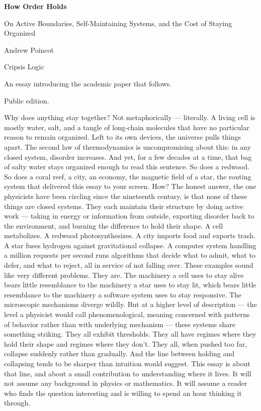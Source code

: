 \documentclass[12pt]{article}
\begin{document}
\begin{titlepage}
\centering
\vspace*{1.5in}
{\Huge\bfseries How Order Holds\par}
\vspace{0.4in}
{\Large On Active Boundaries, Self-Maintaining Systems, and the Cost of Staying Organized\par}
\vspace{0.8in}
{\large Andrew Poincot\par}
{\large Cripsis Logic\par}
\vfill
{An essay introducing the academic paper that follows.\par}
{Public edition.\par}
\end{titlepage}


Why does anything stay together? Not metaphorically --- literally. A living cell is mostly water, salt, and a tangle of long-chain molecules that have no particular reason to remain organized. Left to its own devices, the universe pulls things apart. The second law of thermodynamics is uncompromising about this: in any closed system, disorder increases. And yet, for a few decades at a time, that bag of salty water stays organized enough to read this sentence. So does a redwood. So does a coral reef, a city, an economy, the magnetic field of a star, the routing system that delivered this essay to your screen. How? The honest answer, the one physicists have been circling since the nineteenth century, is that none of these things are closed systems. They each maintain their structure by doing active work --- taking in energy or information from outside, exporting disorder back to the environment, and burning the difference to hold their shape. A cell metabolizes. A redwood photosynthesizes. A city imports food and exports trash. A star fuses hydrogen against gravitational collapse. A computer system handling a million requests per second runs algorithms that decide what to admit, what to defer, and what to reject, all in service of not falling over. These examples sound like very different problems. They are. The machinery a cell uses to stay alive bears little resemblance to the machinery a star uses to stay lit, which bears little resemblance to the machinery a software system uses to stay responsive. The microscopic mechanisms diverge wildly. But at a higher level of description --- the level a physicist would call phenomenological, meaning concerned with patterns of behavior rather than with underlying mechanism --- these systems share something striking. They all exhibit thresholds. They all have regimes where they hold their shape and regimes where they don't. They all, when pushed too far, collapse suddenly rather than gradually. And the line between holding and collapsing tends to be sharper than intuition would suggest. This essay is about that line, and about a small contribution to understanding where it lives. It will not assume any background in physics or mathematics. It will assume a reader who finds the question interesting and is willing to spend an hour thinking it through.
\end{document}
